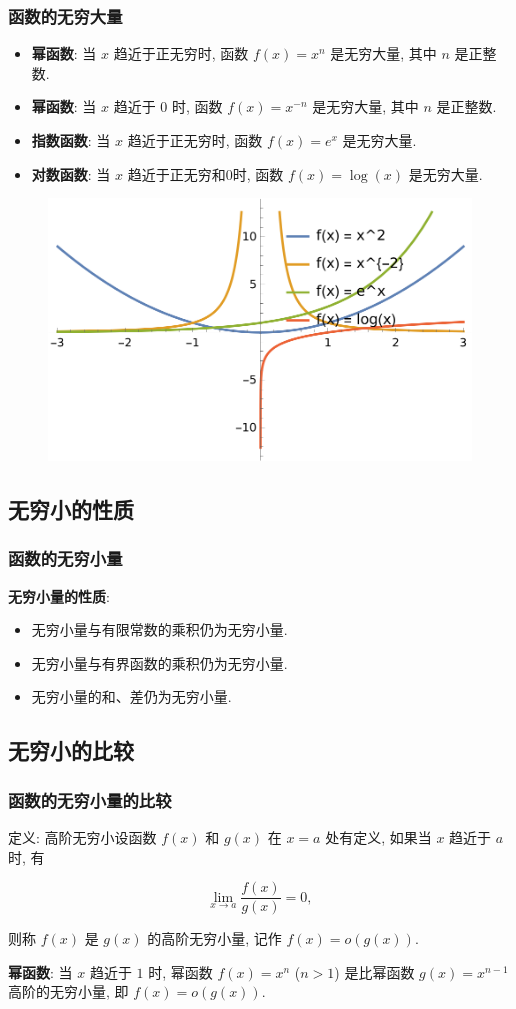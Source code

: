 \documentclass[
10pt, 
aspectratio=43, 
]{beamer}
\begin{document}
\begin{frame}
\frametitle{函数的无穷大量}
\begin{itemize}
\item<1-> \textbf{幂函数}: 当 $x$ 趋近于正无穷时, 函数 $f(x) = x^n$ 是无穷大量, 其中 $n$ 是正整数. 
\item<2-> \textbf{幂函数}: 当 $x$ 趋近于 $0$ 时, 函数 $f(x) = x^{-n}$ 是无穷大量, 其中 $n$ 是正整数. 
\item<3-> \textbf{指数函数}: 当 $x$ 趋近于正无穷时, 函数 $f(x) = e^x$ 是无穷大量. 
\item<4-> \textbf{对数函数}: 当 $x$ 趋近于正无穷和$0$时, 函数 $f(x) = \log(x)$ 是无穷大量. 
\end{itemize}

\begin{figure}
    \centering
    \includegraphics[width=0.5\linewidth]{infty.png}
    \label{fig: enter-label}
\end{figure}

\end{frame}


\subsection{无穷小的性质}

\begin{frame}
\frametitle{函数的无穷小量}

\textbf{无穷小量的性质}: 
\begin{itemize}
    \item 无穷小量与有限常数的乘积仍为无穷小量.\pause 
    \item 无穷小量与有界函数的乘积仍为无穷小量. \pause
    \item 无穷小量的和、差仍为无穷小量. \pause
\end{itemize}


\end{frame}

\subsection{无穷小的比较}
\begin{frame}
\frametitle{函数的无穷小量的比较}

\begin{block}{定义: 高阶无穷小}设函数 $f(x)$ 和 $g(x)$ 在 $x=a$ 处有定义, 如果当 $x$ 趋近于 $a$ 时, 有 

\[
\lim_{x\to a}\frac{f(x)}{g(x)}=0, 
\]

则称 $f(x)$ 是 $g(x)$ 的高阶无穷小量, 记作 $f(x) = o(g(x))$. 
\end{block}
\pause
\textbf{幂函数}: 当 $x$ 趋近于 $1$ 时, 幂函数 $f(x) = x^n$ ($n>1$) 是比幂函数 $g(x) = x^{n-1}$ 高阶的无穷小量, 即 $f(x) = o(g(x))$. 
\pause
\end{frame}
\end{document}
